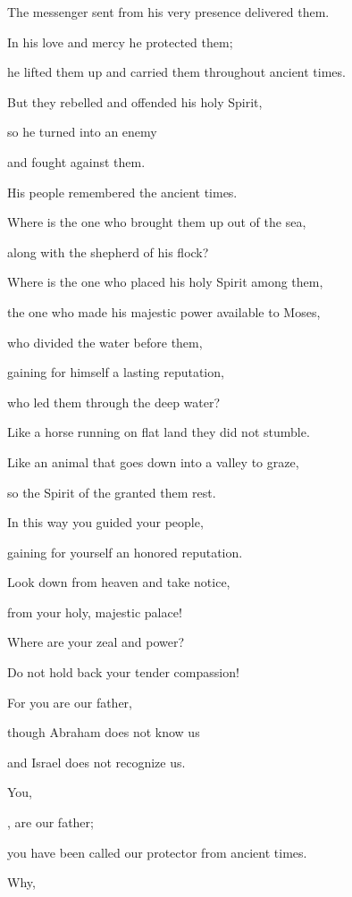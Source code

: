 {\par }{\Q The messenger
sent from his very presence
delivered
them.
\par }{\Q In his love
and mercy
he protected
them;
\par }{\Q he lifted them
up and carried
them throughout
ancient
times.
\par }{\Q {}But they
rebelled
and offended
his holy
Spirit,
\par }{\Q so he turned
into an enemy
\par }{\Q and fought against them.
\par }{\Q {}His people
remembered
the ancient
times.
\par }{\Q Where
is the one who brought
them up out
of the sea,
\par }{\Q along with
the shepherd
of his flock?
\par }{\Q Where
is the one who placed
his holy
Spirit
among them,
\par }{\Q {}the one who made his majestic
power
available to Moses,
\par }{\Q who divided
the water
before
them,
\par }{\Q gaining
for himself a lasting
reputation,
\par }{\Q {}who led
them through the deep
water?
\par }{\Q Like a horse
running on flat land
they did not
stumble.
\par }{\Q {}Like an animal
that goes down
into a valley
to graze,

\par }{\Q so the Spirit
of the {}
granted them rest.
\par }{\Q In this way
you guided
your people,
\par }{\Q gaining
for yourself an honored reputation.
\par }{\Q {}Look down
from heaven
and take notice,
\par }{\Q from your holy,
majestic
palace!
\par }{\Q Where
are your zeal
and power?
\par }{\Q Do not hold back
your tender
compassion!
\par }{\Q {}For
you
are our father,
\par }{\Q though
Abraham
does not
know
us
\par }{\Q and Israel
does not
recognize
us.
\par }{\Q You,

{}, are our father;
\par }{\Q you have been called
our protector
from ancient times.
\par }{\Q {}Why,

}
